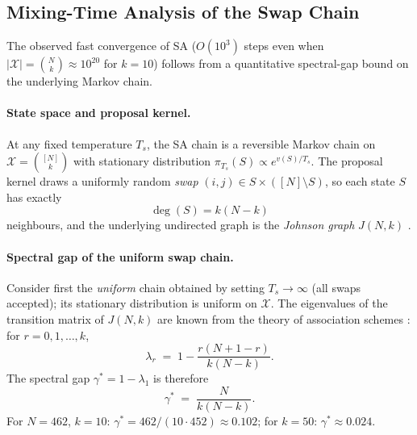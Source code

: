 \documentclass[11pt]{article}
\begin{document}
\subsection{Mixing-Time Analysis of the Swap Chain}
\label{sec:mixing}

The observed fast convergence of SA ($O(10^3)$ steps even when
$|\mathcal{X}|=\binom{N}{k}\approx 10^{20}$ for $k=10$) follows from
a quantitative spectral-gap bound on the underlying Markov chain.

\paragraph{State space and proposal kernel.}
At any fixed temperature $T_s$, the SA chain is a reversible Markov
chain on $\mathcal{X}=\binom{[N]}{k}$ with stationary distribution
$\pi_{T_s}(S)\propto e^{v(S)/T_s}$.
The proposal kernel draws a uniformly random \emph{swap}
$(i,j)\in S\times([N]\setminus S)$, so each state $S$ has exactly
\begin{equation}
  \deg(S) = k(N-k)
  \label{eq:degree}
\end{equation}
neighbours, and the underlying undirected graph is the
\emph{Johnson graph} $J(N,k)$ \cite{Godsil1993}.

\paragraph{Spectral gap of the uniform swap chain.}
Consider first the \emph{uniform} chain obtained by setting $T_s\to\infty$
(all swaps accepted); its stationary distribution is uniform on
$\mathcal{X}$.
The eigenvalues of the transition matrix of $J(N,k)$ are known from
the theory of association schemes \cite{Godsil1993}: for $r=0,1,\ldots,k$,
\begin{equation}
  \lambda_r
  \;=\;
  1 - \frac{r(N+1-r)}{k(N-k)}.
  \label{eq:jkeval}
\end{equation}
The spectral gap $\gamma^* = 1-\lambda_1$ is therefore
\begin{equation}
  \boxed{
  \gamma^* \;=\; \frac{N}{k(N-k)}.
  }
  \label{eq:gap}
\end{equation}
For $N=462$, $k=10$: $\gamma^*=462/(10\cdot 452)\approx 0.102$;
for $k=50$: $\gamma^*\approx 0.024$.
\end{document}
